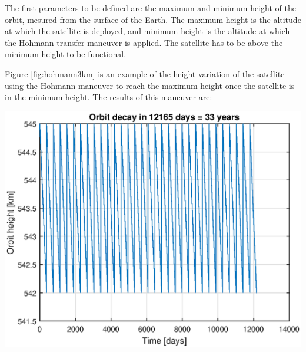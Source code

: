 The first parameters to be defined are the maximum and minimum height of the orbit, mesured from the surface of the Earth. The maximum height is the altitude at which the satellite is deployed, and minimum height is the altitude at which the Hohmann transfer maneuver is applied. The satellite has to be above the minimum height to be functional.

Figure \ref{fig:hohmann3km} is an example of the height variation of the satellite using the Hohmann maneuver to reach the maximum height once the satellite is in the minimum height. The results of this maneuver are:

\begin{minipage}{\textwidth}
\begin{minipage}[b]{0.49\textwidth}
\centering
\includegraphics[scale=0.4]{ThrustersDrag/thrust3km.eps}
\label{fig:hohmann3km}
\end{minipage}
\hfill
{}
\end{minipage}

